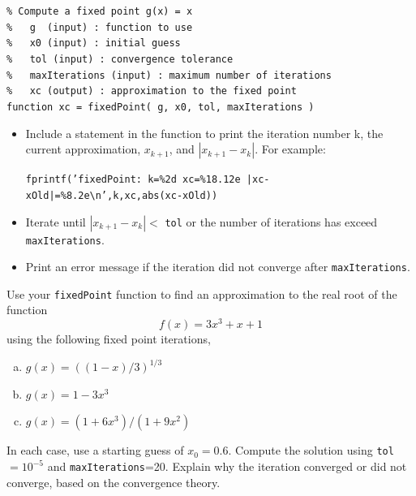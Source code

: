 \documentclass[10pt,letterpaper]{article}
\begin{document}
{\tt \% Compute a fixed point g(x) = x\\
\indent \% \ \ g \ (input) : function to use\\
\indent \% \ \ x0 (input) : initial guess\\
\indent \% \ \ tol (input) : convergence tolerance\\
\indent \% \ \ maxIterations (input) : maximum number of iterations\\
\indent \% \ \ xc (output) : approximation to the fixed point\\
\indent function xc = fixedPoint( g, x0, tol, maxIterations )}
\begin{itemize}

\item Include a statement in the function to print the iteration number k, the current approximation, $x_{k + 1}$, and $|x_{k + 1} - x_{k}|$. For example:

{\tt fprintf(’fixedPoint: k=\%2d xc=\%18.12e |xc-xOld|=\%8.2e\textbackslash n’,k,xc,abs(xc-xOld))}

\item Iterate until $|x_{k + 1} - x_{k}| <$ {\tt tol} or the number of iterations has exceed {\tt maxIterations}.

\item Print an error message if the iteration did not converge after {\tt maxIterations}. 

\end{itemize}
Use your {\tt fixedPoint} function to find an approximation to the real root of the function
$$f(x) = 3x^{3} + x + 1$$
using the following fixed point iterations,

\begin{enumerate}[(a)]

\item $g(x) = \left( (1 - x)/3 \right)^{1/3}$

\item $g(x) = 1 - 3x^{3}$

\item $g(x) = (1 + 6x^{3}) / (1 + 9x^{2})$

\end{enumerate}
In each case, use a starting guess of $x_{0} = 0.6$. Compute the solution using {\tt tol}$= 10^{-5}$ and {\tt maxIterations}=20. Explain why the iteration converged or did not converge, based on the convergence theory. 
\end{document}
